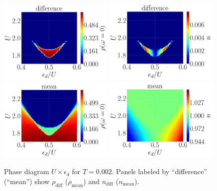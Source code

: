 \documentclass[12pt]{report}
\begin{document}
\begin{figure}[H]
\includegraphics[width=0.49\textwidth]{fig/dmft/fig_diffe-w0-T0002.png}
\hfill
\includegraphics[width=0.49\textwidth]{fig/dmft/fig_diffe-nn-T0002.png}
\includegraphics[width=0.49\textwidth]{fig/dmft/fig_mean2-w0-T0002.png}
\hfill
\includegraphics[width=0.49\textwidth]{fig/dmft/fig_mean2-nn-T0002.png}
\caption{Phase diagram  $U \times \epsilon_d$ for $T=0.002$. Panels labeled by ``difference'' (``mean'') show $\rho_{\text{diff}}$ ($\rho_{\text{mean}}$) and $n_{\text{diff}}$ ($n_{\text{mean}}$).}
\label{fig:Diagram_Drho_U_ed_T0002}
\end{figure}
\end{document}
